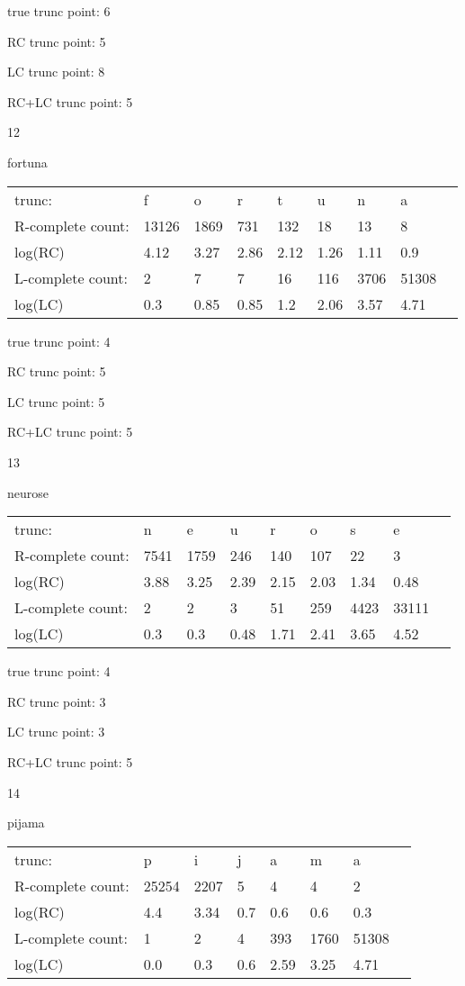 \documentclass{article}
\begin{document}
true trunc point: 6

RC trunc point: 5

LC trunc point: 8

RC+LC trunc point: 5

\vspace{1em}

12

fortuna

\begin{tabular}{l|llllllll}
trunc: & f & o & r & t & u & n & a & \\ 
R-complete count: & 13126 & 1869 & 731 & 132 & 18 & 13 & 8 & \\ 
log(RC) & 4.12 & 3.27 & 2.86 & 2.12 & 1.26 & 1.11 & 0.9 & \\ 
L-complete count: & 2 & 7 & 7 & 16 & 116 & 3706 & 51308 & \\ 
log(LC) & 0.3 & 0.85 & 0.85 & 1.2 & 2.06 & 3.57 & 4.71 & \\ 
\end{tabular}

true trunc point: 4

RC trunc point: 5

LC trunc point: 5

RC+LC trunc point: 5

\newpage

13

neurose

\begin{tabular}{l|llllllll}
trunc: & n & e & u & r & o & s & e & \\ 
R-complete count: & 7541 & 1759 & 246 & 140 & 107 & 22 & 3 & \\ 
log(RC) & 3.88 & 3.25 & 2.39 & 2.15 & 2.03 & 1.34 & 0.48 & \\ 
L-complete count: & 2 & 2 & 3 & 51 & 259 & 4423 & 33111 & \\ 
log(LC) & 0.3 & 0.3 & 0.48 & 1.71 & 2.41 & 3.65 & 4.52 & \\ 
\end{tabular}

true trunc point: 4

RC trunc point: 3

LC trunc point: 3

RC+LC trunc point: 5

\vspace{1em}

14

pijama

\begin{tabular}{l|lllllll}
trunc: & p & i & j & a & m & a & \\ 
R-complete count: & 25254 & 2207 & 5 & 4 & 4 & 2 & \\ 
log(RC) & 4.4 & 3.34 & 0.7 & 0.6 & 0.6 & 0.3 & \\ 
L-complete count: & 1 & 2 & 4 & 393 & 1760 & 51308 & \\ 
log(LC) & 0.0 & 0.3 & 0.6 & 2.59 & 3.25 & 4.71 & \\ 
\end{tabular}
\end{document}
